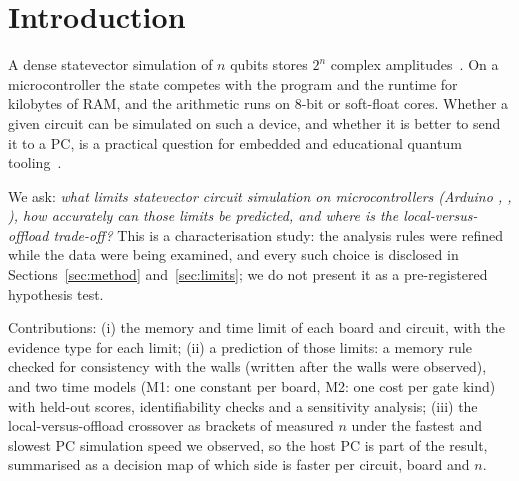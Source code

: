 \section{Introduction}
A dense statevector simulation of $n$ qubits stores $2^n$ complex amplitudes~\cite{haener2017}. On a microcontroller the state competes with the program and the runtime for kilobytes of RAM, and the arithmetic runs on 8-bit or soft-float cores. Whether a given circuit can be simulated on such a device, and whether it is better to send it to a PC, is a practical question for embedded and educational quantum tooling~\cite{carney2023}.

We ask: \emph{what limits statevector circuit simulation on microcontrollers (Arduino \uno, \espA, \espB), how accurately can those limits be predicted, and where is the local-versus-offload trade-off?} This is a characterisation study: the analysis rules were refined while the data were being examined, and every such choice is disclosed in Sections~\ref{sec:method} and~\ref{sec:limits}; we do not present it as a pre-registered hypothesis test.

Contributions: (i) the memory and time limit of each board and circuit, with the evidence type for each limit; (ii) a prediction of those limits: a memory rule checked for consistency with the walls (written after the walls were observed), and two time models (M1: one constant per board, M2: one cost per gate kind) with held-out scores, identifiability checks and a sensitivity analysis; (iii) the local-versus-offload crossover as brackets of measured $n$ under the fastest and slowest PC simulation speed we observed, so the host PC is part of the result, summarised as a decision map of which side is faster per circuit, board and $n$.
